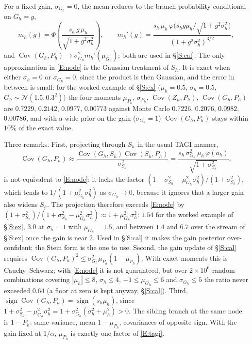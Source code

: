 \documentclass[letterpaper]{article}
\begin{document}
For a fixed gain, $\sigma_{G_h}=0$, the mean reduces to the branch probability conditional on $G_h=g$,
\begin{equation}
m_h(g)=\Phi\!\left(\frac{s_h\,g\,\mu_h}{\sqrt{1+g^2\sigma_h^2}}\right),\qquad
m_h'(g)=\frac{s_h\,\mu_h\,\varphi\big(s_hg\mu_h/\sqrt{1+g^2\sigma_h^2}\big)}{(1+g^2\sigma_h^2)^{3/2}},
\label{E:mg}
\end{equation}
and $\operatorname{Cov}(G_h,P_h)\to\sigma^2_{G_h}m_h'(\mu_{G_h})$; both are used in \S\ref{S:cal}. The only approximation in \eqref{E:node} is the Gaussian treatment of $S_h$. It is exact when either $\sigma_h=0$ or $\sigma_{G_h}=0$, since the product is then Gaussian, and the error in between is small: for the worked example of \S\ref{S:ex} ($\mu_h=0.5$, $\sigma_h=0.5$, $G_h\sim\mathcal N(1.5,0.3^2)$) the four moments $\mu_{P_h}$, $\sigma_{P_h}$, $\operatorname{Cov}(Z_h,P_h)$, $\operatorname{Cov}(G_h,P_h)$ are $0.7229$, $0.2142$, $0.0977$, $0.00773$ against Monte Carlo $0.7226$, $0.2076$, $0.0982$, $0.00786$, and with a wide prior on the gain ($\sigma_{G_h}=1$) $\operatorname{Cov}(G_h,P_h)$ stays within $10\%$ of the exact value.

Three remarks. First, projecting through $S_h$ in the usual TAGI manner,
\begin{equation}
\operatorname{Cov}(G_h,P_h)\approx\frac{\operatorname{Cov}(G_h,S_h)\operatorname{Cov}(S_h,P_h)}{\sigma^2_{S_h}}=\frac{s_h\,\sigma^2_{G_h}\,\mu_h\,\varphi(a_h)}{\sqrt{1+\sigma^2_{S_h}}},
\end{equation}
is not equivalent to \eqref{E:node}: it lacks the factor $(1+\sigma^2_{S_h}-\mu^2_{G_h}\sigma_h^2)/(1+\sigma^2_{S_h})$, which tends to $1/(1+\mu^2_{G_h}\sigma_h^2)$ as $\sigma_{G_h}\to0$, because it ignores that a larger gain also widens $S_h$. The projection therefore exceeds \eqref{E:node} by $(1+\sigma^2_{S_h})/(1+\sigma^2_{S_h}-\mu^2_{G_h}\sigma_h^2)\approx1+\mu^2_{G_h}\sigma_h^2$: $1.54$ for the worked example of \S\ref{S:ex}, $3.0$ at $\sigma_h=1$ with $\mu_{G_h}=1.5$, and between $1.4$ and $6.7$ over the stream of \S\ref{S:ex} once the gain is near $2$. Used in \S\ref{S:cal} it makes the gain posterior over-confident; the Stein form is the one to use. Second, the gain update of \S\ref{S:cal} requires $\operatorname{Cov}(G_h,P_h)^2\le\sigma^2_{G_h}\mu_{P_h}(1-\mu_{P_h})$. With exact moments this is Cauchy--Schwarz; with \eqref{E:node} it is not guaranteed, but over $2\times10^6$ random combinations covering $|\mu_h|\le8$, $\sigma_h\le4$, $-1\le\mu_{G_h}\le6$ and $\sigma_{G_h}\le5$ the ratio never exceeded $0.64$ (a floor at zero is kept anyway, \S\ref{S:cal}). Third, $\operatorname{sign}\operatorname{Cov}(G_h,P_h)=\operatorname{sign}(s_h\mu_h)$, since $1+\sigma^2_{S_h}-\mu^2_{G_h}\sigma_h^2=1+\sigma^2_{G_h}(\sigma_h^2+\mu_h^2)>0$. The sibling branch at the same node is $1-P_h$: same variance, mean $1-\mu_{P_h}$, covariances of opposite sign. With the gain fixed at $1/\alpha$, $\mu_{P_h}$ is exactly one factor of \eqref{E:tagi}.
\end{document}
